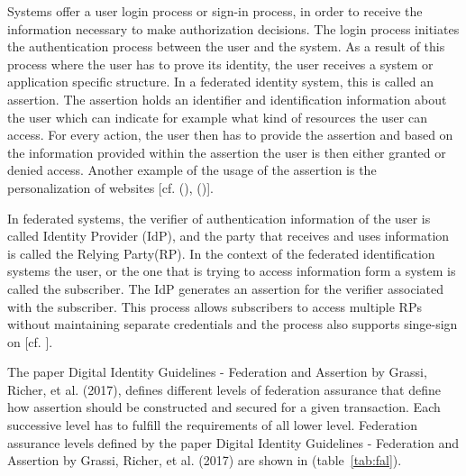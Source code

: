 Systems offer a user login process or sign-in process, in order to receive the information necessary to make authorization decisions. The login process initiates the authentication process between the user and the system. As a result of this process where the user has to prove its identity, the user receives a system or application specific structure. In a federated identity system, this is called an assertion. The assertion holds an identifier and identification information about the user which can indicate for example what kind of resources the user can access. For every action, the user then has to provide the assertion and based on the information provided within the assertion the user is then either granted or denied access. Another example of the usage of the assertion is the personalization of websites [cf. (\cite{Todorov:2007:MUI}), (\cite{NIST:2017:DIG})].

In federated systems, the verifier of authentication information of the user is called Identity Provider (IdP), and the party that receives and uses information is called the Relying Party(RP). In the context of the federated identification systems the user, or the one that is trying to access information form a system is called the subscriber. The IdP generates an assertion for the verifier associated with the subscriber. This process allows subscribers to access multiple RPs without maintaining separate credentials and the process also supports singe-sign on [cf. \cite{NIST:2017:DIGFA}].

The paper Digital Identity Guidelines - Federation and Assertion by Grassi, Richer, et al. (2017), defines different levels of federation assurance that define how assertion should be constructed and secured for a given transaction. Each successive level has to fulfill the requirements of all lower level. Federation assurance levels defined by the paper Digital Identity Guidelines - Federation and Assertion by Grassi, Richer, et al.  (2017) are shown in (table~\ref{tab:fal}).



